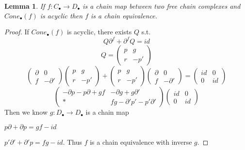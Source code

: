 \documentclass[11pt]{article}
\newtheorem{lemma}[thm]{Lemma}
\newcommand{\pd}{\partial}
\newcommand{\lrta}{\longrightarrow}
\begin{document}
\begin{lemma}
If $f:C_\bullet\lrta D_\bullet$ is a chain map between two free chain complexes and $Cone_\bullet(f)$ is acyclic then $f$ is  a chain equivalence.
\end{lemma}
\begin{proof}
If $Cone_\bullet(f)$ is acyclic, there exists $Q$ s.t.
$$
Q\pd^f+\pd^f Q=id
$$
$$
Q=
\begin{pmatrix*}
p & g\\
r & -p'
\end{pmatrix*}
$$
$$
\begin{pmatrix*}
\pd & 0\\
f & -\pd'
\end{pmatrix*}
\begin{pmatrix*}
p & g\\
r & -p'
\end{pmatrix*}
+
\begin{pmatrix*}
p & g\\
r & -p'
\end{pmatrix*}
\begin{pmatrix*}
\pd & 0\\
f & -\pd'
\end{pmatrix*}
=\begin{pmatrix*}
id & 0\\
0 & id
\end{pmatrix*}
$$
$$
\begin{pmatrix*}
-\pd p-p\pd +gf & -\pd g+g \pd'\\
* & fg-\pd' p'-p'\pd'
\end{pmatrix*}
\begin{pmatrix*}
id & 0\\
0 & id
\end{pmatrix*}
$$
Then we know 
$g:D_\bullet \lrta D_\bullet$ is a chain map

$p\pd +\pd p=gf-id$

$p'\pd'+\pd'p=fg-id$. Thus $f$ is a chain equivalence with inverse $g$.
\end{proof}
\end{document}
